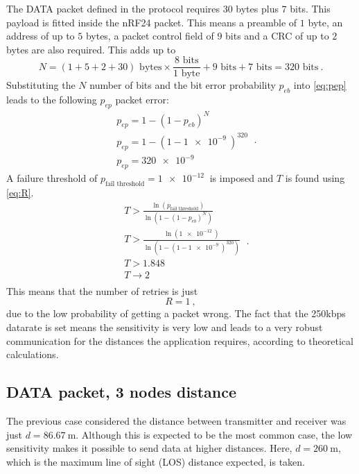 The DATA packet defined in the protocol requires $30$ bytes plus $7$ bits. This payload is fitted inside the nRF24 packet. This means a preamble of $1$ byte, an address of up to $5$ bytes, a packet control field of $9$ bits and a CRC of up to $2$ bytes are also required. This adds up to
\begin{equation}
	N = \left( 1 + 5 + 2  + 30 \right)  \text{ bytes} \times \frac{8 \text{ bits}}{1 \text{ byte}} + 9 \text{ bits} + 7 \text{ bits} = 320 \text{ bits} \ .
\end{equation}
Substituting the $N$ number of bits and the bit error probability $p_{eb}$ into \eqref{eq:pep} leads to the following $p_{ep}$ packet error:
\begin{equation}
	\begin{split}
		& p_{ep} = 1 - \left( 1 - p_{eb} \right)^N \\
		& p_{ep} = 1 - \left( 1 - \SI{1e-9}{} \right)^{320} \\
		& p_{ep} = \SI{320e-9}{}
	\end{split} \ .
\end{equation}
A failure threshold of $p_{\text{fail threshold}} = \SI{1e-12}{}$ is imposed and $T$ is found using \eqref{eq:R}.
\begin{equation}
	\begin{split}
		& T > \frac{\ln \left( p_{\text{fail threshold}}  \right) }{\ln \left( 1 - \left( 1 - p_{eb} \right)^N \right) } \\
		& T > \frac{\ln \left( \SI{1e-12}{} \right) }{\ln \left( 1 - \left( 1 - \SI{1e-9}{} \right)^{320} \right) } \\
		& T > 1.848 \\
		& T \rightarrow 2 \\
	\end{split} \ .
\end{equation}
This means that the number of retries is just
\begin{equation}
	R = 1 \ ,
\end{equation}
due to the low probability of getting a packet wrong. The fact that the \SI{250}{}kbps datarate is set means the sensitivity is very low and leads to a very robust communication for the distances the application requires, according to theoretical calculations.



\subsection{DATA packet, 3 nodes distance} \label{sub:data3}
The previous case considered the distance between transmitter and receiver was just $d = \SI{86.67}{\m}$. Although this is expected to be the most common case, the low sensitivity makes it possible to send data at higher distances. Here, $d = \SI{260}{\m}$, which is the maximum line of sight (LOS) distance expected, is taken.

